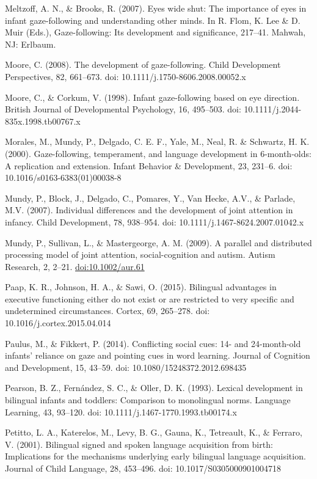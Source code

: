 \documentclass[,man,floatsintext]{apa6}
\begin{document}
Meltzoff, A. N., \& Brooks, R. (2007). Eyes wide shut: The importance of eyes in infant gaze-following and understanding other minds. In R. Flom, K. Lee \& D. Muir (Eds.), Gaze-following: Its development and significance, 217--41. Mahwah, NJ: Erlbaum.

Moore, C. (2008). The development of gaze-following. Child Development Perspectives, 82, 661--673. doi: 10.1111/j.1750-8606.2008.00052.x

Moore, C., \& Corkum, V. (1998). Infant gaze-following based on eye direction. British Journal of Developmental Psychology, 16, 495--503. doi: 10.1111/j.2044-835x.1998.tb00767.x

Morales, M., Mundy, P., Delgado, C. E. F., Yale, M., Neal, R. \& Schwartz, H. K. (2000). Gaze-following, temperament, and language development in 6-month-olds: A replication and extension. Infant Behavior \& Development, 23, 231--6. doi: 10.1016/s0163-6383(01)00038-8

Mundy, P., Block, J., Delgado, C., Pomares, Y., Van Hecke, A.V., \& Parlade, M.V. (2007). Individual differences and the development of joint attention in infancy. Child Development, 78, 938--954. doi: 10.1111/j.1467-8624.2007.01042.x

Mundy, P., Sullivan, L., \& Mastergeorge, A. M. (2009). A parallel and distributed processing model of joint attention, social-cognition and autism. Autism Research, 2, 2--21. \url{doi:10.1002/aur.61}

Paap, K. R., Johnson, H. A., \& Sawi, O. (2015). Bilingual advantages in executive functioning either do not exist or are restricted to very specific and undetermined circumstances. Cortex, 69, 265--278. doi: 10.1016/j.cortex.2015.04.014

Paulus, M., \& Fikkert, P. (2014). Conflicting social cues: 14- and 24-month-old infants' reliance on gaze and pointing cues in word learning. Journal of Cognition and Development, 15, 43--59. doi: 10.1080/15248372.2012.698435

Pearson, B. Z., Fernández, S. C., \& Oller, D. K. (1993). Lexical development in bilingual infants and toddlers: Comparison to monolingual norms. Language Learning, 43, 93--120. doi: 10.1111/j.1467-1770.1993.tb00174.x

Petitto, L. A., Katerelos, M., Levy, B. G., Gauna, K., Tetreault, K., \& Ferraro, V. (2001). Bilingual signed and spoken language acquisition from birth: Implications for the mechanisms underlying early bilingual language acquisition. Journal of Child Language, 28, 453--496. doi: 10.1017/S0305000901004718
\end{document}
